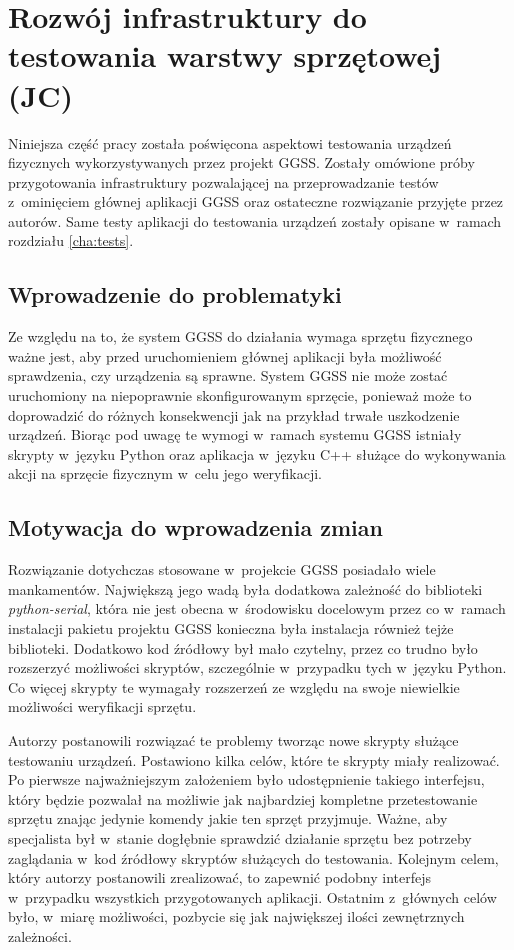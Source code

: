 \clearpage
\section{Rozwój infrastruktury do testowania warstwy sprzętowej (JC)}
\label{ch:hardware_testing}

Niniejsza część pracy została poświęcona aspektowi testowania urządzeń fizycznych wykorzystywanych przez projekt GGSS. Zostały omówione próby przygotowania infrastruktury pozwalającej na przeprowadzanie testów z~ominięciem głównej aplikacji GGSS oraz ostateczne rozwiązanie przyjęte przez autorów. Same testy aplikacji do testowania urządzeń zostały opisane w~ramach rozdziału \ref{cha:tests}.

\subsection{Wprowadzenie do problematyki}
Ze względu na to, że system GGSS do działania wymaga sprzętu fizycznego ważne jest, aby przed uruchomieniem głównej aplikacji była możliwość sprawdzenia, czy urządzenia są sprawne. System GGSS nie może zostać uruchomiony na niepoprawnie skonfigurowanym sprzęcie, ponieważ może to doprowadzić do różnych konsekwencji jak na przykład trwałe uszkodzenie urządzeń. Biorąc pod uwagę te wymogi w~ramach systemu GGSS istniały skrypty w~języku Python oraz aplikacja w~języku C++ służące do wykonywania akcji na sprzęcie fizycznym w~celu jego weryfikacji.

\subsection{Motywacja do wprowadzenia zmian}
Rozwiązanie dotychczas stosowane w~projekcie GGSS posiadało wiele mankamentów. Największą jego wadą była dodatkowa zależność do biblioteki \emph{python-serial}, która nie jest obecna w~środowisku docelowym przez co w~ramach instalacji pakietu projektu GGSS konieczna była instalacja również tejże biblioteki. Dodatkowo kod źródłowy był mało czytelny, przez co trudno było rozszerzyć możliwości skryptów, szczególnie w~przypadku tych w~języku Python. Co więcej skrypty te wymagały rozszerzeń ze względu na swoje niewielkie możliwości weryfikacji sprzętu.

Autorzy postanowili rozwiązać te problemy tworząc nowe skrypty służące testowaniu urządzeń. Postawiono kilka celów, które te skrypty miały realizować. Po pierwsze najważniejszym założeniem było udostępnienie takiego interfejsu, który będzie pozwalał na możliwie jak najbardziej kompletne przetestowanie sprzętu znając jedynie komendy jakie ten sprzęt przyjmuje. Ważne, aby specjalista był w~stanie dogłębnie sprawdzić działanie sprzętu bez potrzeby zaglądania w~kod źródłowy skryptów służących do testowania. Kolejnym celem, który autorzy postanowili zrealizować, to zapewnić podobny interfejs w~przypadku wszystkich przygotowanych aplikacji. Ostatnim z~głównych celów było, w~miarę możliwości, pozbycie się jak największej ilości zewnętrznych zależności.

